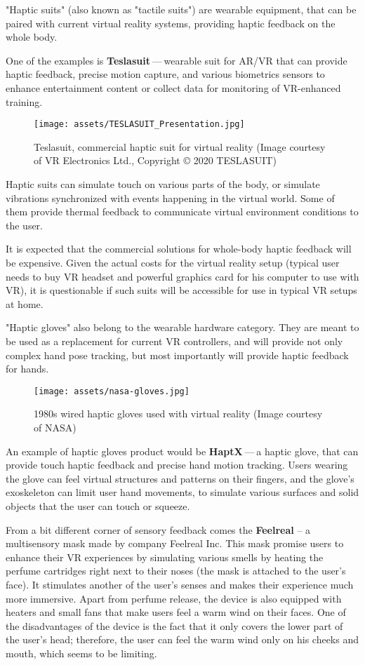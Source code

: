 "Haptic suits" (also known as "tactile suits") are wearable
equipment, that can be paired with current virtual reality systems, providing
haptic feedback on the whole body.


One of the examples is \textbf{Teslasuit} — wearable suit for AR/VR that can provide
haptic feedback, precise motion capture, and various biometrics sensors to
enhance entertainment content or collect data for monitoring of
VR-enhanced training. \cite{teslasuitab}


\begin{figure}[h]{}
\centering\texttt{[image: assets/TESLASUIT\_Presentation.jpg]}
\caption{Teslasuit, commercial haptic suit for virtual reality (Image courtesy of VR Electronics Ltd., Copyright © 2020 TESLASUIT)}

\end{figure}

Haptic suits can simulate touch on various parts of the body, or simulate
vibrations synchronized with events happening in the virtual world. Some
of them provide thermal feedback to communicate virtual environment
conditions to the user.

It is expected that the commercial solutions for whole-body haptic feedback
will be expensive. Given the actual costs for the virtual reality setup
(typical user needs to buy VR headset and powerful graphics card for his computer
to use with VR), it is questionable if such suits will be
accessible for use in typical VR setups at home.


"Haptic gloves" also belong to the wearable hardware category. They are meant to be
used as a replacement for current VR controllers, and will provide not only
complex hand pose tracking, but most importantly will provide
haptic feedback for hands.

\begin{figure}[h]{}
    \centering\texttt{[image: assets/nasa-gloves.jpg]}
    \caption{1980s wired haptic gloves used with virtual reality (Image courtesy of NASA)}
\end{figure}


An example of haptic gloves product would be \textbf{HaptX} — a haptic
glove, that can provide touch haptic feedback and precise
hand motion tracking. Users wearing the glove can feel virtual structures
and patterns on their fingers, and the glove’s exoskeleton can limit user
hand movements, to simulate various surfaces and solid objects that the user can
touch or squeeze. \cite{haptxtech}

From a bit different corner of sensory feedback comes the \textbf{Feelreal} 
-- a multisensory mask made by company Feelreal Inc. This mask promise users to enhance
their VR experiences by simulating various smells by heating the perfume
cartridges right next to their noses (the mask is attached to the user’s face).
It stimulates another of the user’s senses and makes their
experience much more immersive. Apart from perfume release, the device is
also equipped with heaters and small fans that make users feel a warm
wind on their faces. One of the disadvantages of the device is the fact that
it only covers the lower part of the user’s head; therefore, the user can feel
the warm wind only on his cheeks and mouth, which seems to be limiting.